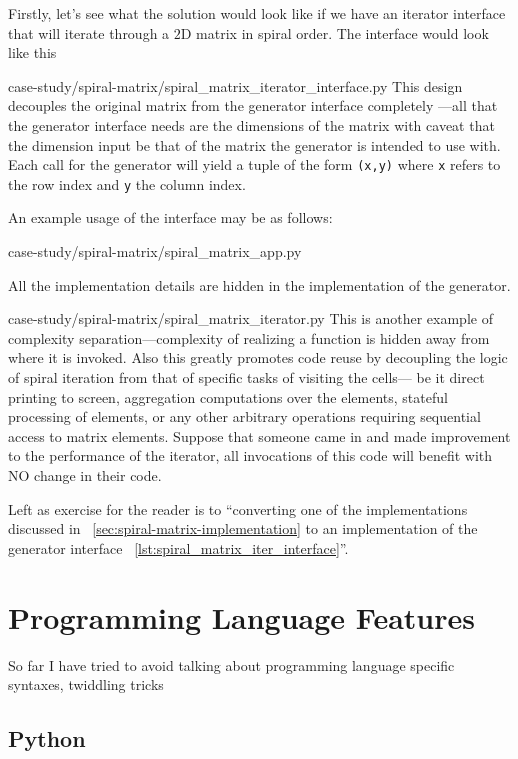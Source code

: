\documentclass[oneside,11pt]{book}
\theoremstyle{definition}
\theoremstyle{remark}
\newcommand{\code}[1]{\mbox{\lstinline{#1}}}
\newcommand{\python}{Python }
\begin{document}
Firstly, let's see what the solution would look like if we have an iterator interface that will
iterate through a $2$D matrix in spiral order.
The interface would look like this

{case-study/spiral-matrix/spiral_matrix_iterator_interface.py}
This design decouples the original matrix from the generator interface completely
---all that the generator interface needs are the dimensions of the matrix with
caveat that the dimension input be that of the matrix the generator is intended to use with.
Each call for the generator will yield a tuple of the form \code{(x,y)}
where \code{x} refers to the row index and \code{y} the column index.

An example usage of the interface may be as follows:

{case-study/spiral-matrix/spiral_matrix_app.py}

All the implementation details are hidden in the implementation of the generator.

{case-study/spiral-matrix/spiral_matrix_iterator.py}
This is another example of complexity separation---complexity of realizing a function is
hidden away from where it is invoked.
Also this greatly promotes code reuse by decoupling the logic of spiral
iteration from that of specific tasks of visiting the cells---
be it direct printing to screen, aggregation
computations over the elements, stateful processing of elements, or any other
arbitrary operations requiring sequential access to matrix elements.
Suppose that someone came in and made improvement to the performance of the iterator,
all invocations of this code will benefit with NO change in their code.

Left as exercise for the reader is to ``converting one of the implementations discussed in
~\autoref{sec:spiral-matrix-implementation} to an
implementation of the generator interface ~\autoref{lst:spiral_matrix_iter_interface}''.
\clearpage{}
    \clearpage{}\chapter{Programming Language Features}\label{ch:knowTheLanguageFeatures}

So far I have tried to avoid talking about programming language specific syntaxes, twiddling
tricks
\section{Python}\label{sec:python}
\end{document}
